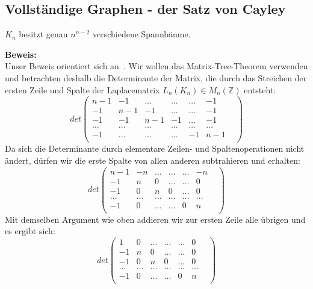 \subsection{Vollständige Graphen - der Satz von Cayley}
\begin{Tms}
$K_n$ besitzt genau $n^{n-2}$ verschiedene Spannbäume.\\
\end{Tms}
\textbf{Beweis:}\\
Unser Beweis orientiert sich an~\cite{Lau_2004}. Wir wollen das Matrix-Tree-Theorem verwenden und betrach\-ten deshalb die Determinante der Matrix, die durch das Streichen der ersten Zeile und Spalte der Laplacematrix $L_n(K_n)\in M_n(\mathbb{Z})$ entsteht:
\begin{equation}
det
\begin{pmatrix}
n-1&-1&\ldots&\ldots&\ldots&-1\\
-1&n-1&-1&\ldots&\ldots&-1\\
-1&-1&n-1&-1&\ldots&-1\\
\ldots&\ldots&\ldots&\ldots&\ldots&\ldots&\\
-1&\ldots&\ldots&\ldots&-1&n-1\\
\end{pmatrix}
\end{equation}
Da sich die Determinante durch elementare Zeilen- und Spaltenoperationen nicht ändert, dürfen wir die erste Spalte von allen anderen subtrahieren und erhalten:
\begin{equation}det
\begin{pmatrix}
n-1&-n&\ldots&\ldots&\ldots&-n\\
-1&n&0&\ldots&\ldots&0\\
-1&0&n&0&\ldots&0\\
\ldots&\ldots&\ldots&\ldots&\ldots&\ldots&\\
-1&0&\ldots&\ldots&0&n\\
\end{pmatrix}
\end{equation}
Mit demselben Argument wie oben addieren wir zur ersten Zeile alle übrigen und es ergibt sich:
\begin{equation}
det
\begin{pmatrix}
1&0&\ldots&\ldots&\ldots&0\\
-1&n&0&\ldots&\ldots&0\\
-1&0&n&0&\ldots&0\\
\ldots&\ldots&\ldots&\ldots&\ldots&\ldots&\\
-1&0&\ldots&\ldots&0&n\\
\end{pmatrix}
\end{equation}
